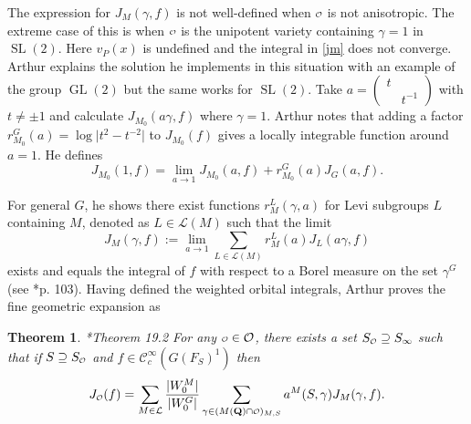\documentclass[11pt]{amsart}
\def\Q{\mathbf Q}
\def\CCC{\mathcal C}
\def\LLL{\mathcal L}
\def\O{\mathcal O}
\def\o{\scalebox{0.8}{$\scriptstyle\mathcal{O}$}}
\def\gl{\operatorname{GL}}
\def\mod#1{\lvert #1 \rvert} %
\def\sl{\operatorname{SL}}
\newtheorem{theorem}{Theorem}[section]
\theoremstyle{remark}
\begin{document}
The expression for $J_M(\gamma, f)$ is not well-defined when $\o$ is not anisotropic. The extreme case of this is when $\o$ is the unipotent variety containing $\gamma = 1$ in $\sl(2)$. Here $v_P(x)$ is undefined and the integral in \cref{jm} does not converge. Arthur explains the solution he implements in this situation with an example of the group $\gl(2)$ but the same works for $\sl(2)$. Take $a = \begin{pmatrix} t & \\ & t^{-1} \end{pmatrix}$ with $t \neq \pm 1$ and calculate $J_{M_0}(a\gamma, f)$ where $\gamma = 1$. Arthur notes that adding a factor $r_{M_0}^G(a) = \log \mod{t^2 - t^{-2}}$ to $J_{M_0}(f)$ gives a locally integrable function around $a=1$. He defines
\begin{equation} \label{lim_orbint}
	J_{M_0}(1, f) = \lim_{a \to 1} J_{M_0}(a, f) + r_{M_0}^G(a) J_G(a, f).
\end{equation}

For general $G$, he shows there exist functions $r_M^L(\gamma, a)$ for Levi subgroups $L$ containing $M$, denoted as $L \in \LLL(M)$ such that the limit
\[ J_M(\gamma, f) := \lim_{a \to 1} \sum_{L \in \LLL(M)} r_M^L(a) J_L(a\gamma, f) \]
exists and equals the integral of $f$ with respect to a Borel measure on the set $\gamma^G$ (see \cite{clay}*{p. 103}). Having defined the weighted orbital integrals, Arthur proves the fine geometric expansion as
\begin{theorem} \cite{clay}*{Theorem 19.2}
	For any $\o \in \O$, there exists a set $S_{\o} \supseteq S_\infty$ such that if $S \supseteq S_{\o}$ and $f \in \CCC_c^\infty(G(F_S)^1)$ then
	\[ J_{\o}(f) = \sum_{M \in \LLL} \frac{\mod{W_0^M}}{\mod{W_0^G}} \sum_{\gamma \in (M(\Q)\cap \o)_{M, S}}
			a^M(S, \gamma) J_M(\gamma, f). \]
\end{theorem}
\end{document}
